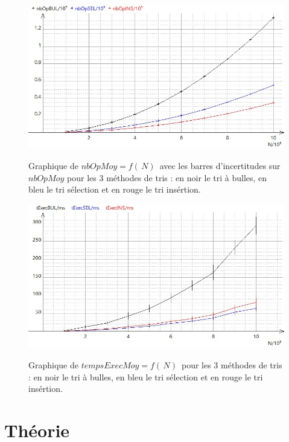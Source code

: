 \documentclass{report}
\begin{document}
\begin{figure}[H]
	\includegraphics[width=\textwidth]{../graphe/nbOP10a10k.jpg}
	\label{nbOP1k}
	\caption{Graphique de $nbOpMoy=f(\,N)\,$ avec les barres d'incertitudes sur $nbOpMoy$ pour les 3 méthodes de tris : en noir le tri à bulles, en bleu le tri sélection et en rouge le tri insértion.}
\end{figure}
\begin{figure}[H]
	\includegraphics[width=\textwidth]{../graphe/tExec10a10k.jpg}
	\label{tExec1k}
	\caption{Graphique de $tempsExecMoy=f(\,N)\,$ pour les 3 méthodes de tris : en noir le tri à bulles, en bleu le tri sélection et en rouge le tri insértion.}
\end{figure}






\newpage
\chapter{Théorie}
\end{document}

